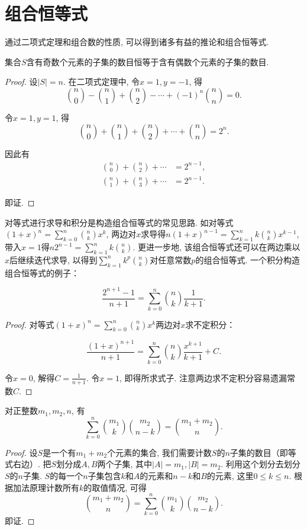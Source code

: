 \section{组合恒等式}
通过二项式定理和组合数的性质, 可以得到诸多有益的推论和组合恒等式.

\begin{corollary}
    集合\(S\)含有奇数个元素的子集的数目恒等于含有偶数个元素的子集的数目.
\end{corollary}
\begin{proof}
    设\(|S|=n\).   在二项式定理中, 令\(x=1, y=-1\), 得
    \[\binom{n}{0} - \binom{n}{1} + \binom{n}{2} - \cdots + (-1)^n \binom{n}{n} = 0 .  \]

    令\(x=1, y=1\), 得
    \[\binom{n}{0} + \binom{n}{1} + \binom{n}{2} + \cdots + \binom{n}{n} = 2^n.  \]

    因此有
    \begin{align*}
        \binom{n}{0} + \binom{n}{2} + \cdots & = 2^{n-1}, \\
        \binom{n}{1} + \binom{n}{3} + \cdots & = 2^{n-1}.
    \end{align*}

    即证.
\end{proof}

对等式进行求导和积分是构造组合恒等式的常见思路.  如对等式\((1 + x)^n = \sum_{k=0}^{n} \binom{n}{k} x^k\), 两边对\(x\)求导得\(n(1 + x)^{n-1} = \sum_{k=1}^{n} k \binom{n}{k} x^{k-1}\), 带入\(x=1\)得\(n 2^{n-1} = \sum_{k=1}^{n} k \binom{n}{k}\).  更进一步地, 该组合恒等式还可以在两边乘以\(x\)后继续迭代求导, 以得到\(\sum_{k=1}^{n} k^p \binom{n}{k}\)对任意常数\(p\)的组合恒等式.  一个积分构造组合恒等式的例子：

\begin{corollary}
    $$\frac{2^{n+1}-1}{n+1} = \sum_{k=0}^{n} \binom{n}{k} \frac{1}{k+1}.  $$
\end{corollary}
\begin{proof}
    对等式\((1 + x)^n = \sum_{k=0}^{n} \binom{n}{k} x^k\)两边对\(x\)求不定积分：

    \[\frac{(1+x)^{n+1}}{n+1} = \sum_{k=0}^{n} \binom{n}{k} \frac{x^{k+1}}{k+1} + C.  \]

    令\(x=0\), 解得\(C=\frac{1}{n+1}\).   令\(x=1\), 即得所求式子.  注意两边求不定积分容易遗漏常数\(C\).
\end{proof}

\begin{corollary}[范德蒙卷积公式]
    对正整数\(m_1,  m_2,  n\), 有
    \[\sum_{k=0}^{n} \binom{m_1}{k} \binom{m_2}{n-k} = \binom{m_1+m_2}{n}.  \]
\end{corollary}
\begin{proof}
    设\(S\)是一个有\(m_1+m_2\)个元素的集合, 我们需要计数\(S\)的\(n\)子集的数目（即等式右边）.  把\(S\)划分成\(A, B\)两个子集, 其中\(|A|=m_1, |B|=m_2\).  利用这个划分去划分\(S\)的\(n\)子集.  \(S\)的每一个\(n\)子集包含\(k\)和\(A\)的元素和\(n-k\)和\(B\)的元素, 这里\(0\leq k \leq n\).  根据加法原理计数所有\(k\)的取值情况, 可得
    \[\binom{m_1+m_2}{n}=\sum_{k=0}^{n} \binom{m_1}{k} \binom{m_2}{n-k} .  \]
    即证.
\end{proof}


